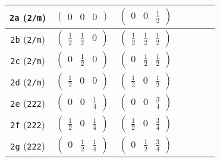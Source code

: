\documentclass[fleqn,9pt,landscape]{jsarticle}
\begin{document}
\begin{center}
\begin{longtable}{ccccccc}
{\tt 2a} ({\tt 2/m}) & $ \begin{pmatrix} 0 & 0 & 0 \end{pmatrix} $ & $ \begin{pmatrix} 0 & 0 & \frac{1}{2} \end{pmatrix} $ & $  $ & $  $ & $  $ & $  $ \\ \hline
{\tt 2b} ({\tt 2/m}) & $ \begin{pmatrix} \frac{1}{2} & \frac{1}{2} & 0 \end{pmatrix} $ & $ \begin{pmatrix} \frac{1}{2} & \frac{1}{2} & \frac{1}{2} \end{pmatrix} $ & $  $ & $  $ & $  $ & $  $ \\ \hline
{\tt 2c} ({\tt 2/m}) & $ \begin{pmatrix} 0 & \frac{1}{2} & 0 \end{pmatrix} $ & $ \begin{pmatrix} 0 & \frac{1}{2} & \frac{1}{2} \end{pmatrix} $ & $  $ & $  $ & $  $ & $  $ \\ \hline
{\tt 2d} ({\tt 2/m}) & $ \begin{pmatrix} \frac{1}{2} & 0 & 0 \end{pmatrix} $ & $ \begin{pmatrix} \frac{1}{2} & 0 & \frac{1}{2} \end{pmatrix} $ & $  $ & $  $ & $  $ & $  $ \\ \hline
{\tt 2e} ({\tt 222}) & $ \begin{pmatrix} 0 & 0 & \frac{1}{4} \end{pmatrix} $ & $ \begin{pmatrix} 0 & 0 & \frac{3}{4} \end{pmatrix} $ & $  $ & $  $ & $  $ & $  $ \\ \hline
{\tt 2f} ({\tt 222}) & $ \begin{pmatrix} \frac{1}{2} & 0 & \frac{1}{4} \end{pmatrix} $ & $ \begin{pmatrix} \frac{1}{2} & 0 & \frac{3}{4} \end{pmatrix} $ & $  $ & $  $ & $  $ & $  $ \\ \hline
{\tt 2g} ({\tt 222}) & $ \begin{pmatrix} 0 & \frac{1}{2} & \frac{1}{4} \end{pmatrix} $ & $ \begin{pmatrix} 0 & \frac{1}{2} & \frac{3}{4} \end{pmatrix} $ & $  $ & $  $ & $  $ & $  $ \\ \hline

\end{longtable}
\end{center}
\end{document}
